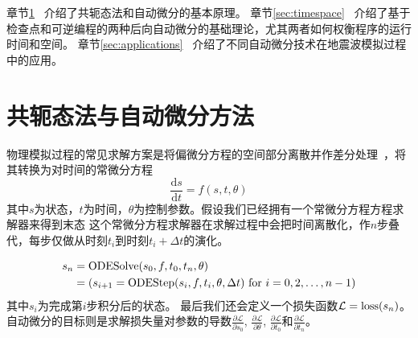 \documentclass[A4,twoside,fontset=ubuntu,UTF8]{ctexart}
\def\D{\mathrm{d}}
\begin{document}

章节\ref{sec:forwardbackward}~ 介绍了共轭态法和自动微分的基本原理。
章节\ref{sec:timespace}~ 介绍了基于检查点和可逆编程的两种后向自动微分的基础理论，尤其两者如何权衡程序的运行时间和空间。
章节\ref{sec:applications}~ 介绍了不同自动微分技术在地震波模拟过程中的应用。

\section{共轭态法与自动微分方法}\label{sec:forwardbackward}

    物理模拟过程的常见求解方案是将偏微分方程的空间部分离散并作差分处理~\cite{Grote2010}，将其转换为对时间的常微分方程
    $$\frac{\D s}{\D t} = f(s, t, \theta)$$
其中$s$为状态，$t$为时间，$\theta$为控制参数。假设我们已经拥有一个常微分方程方程求解器来得到末态
这个常微分方程求解器在求解过程中会把时间离散化，作$n$步叠代，每步仅做从时刻$t_i$到时刻$t_{i}+\Delta t$的演化。

\begin{align}
    \begin{split}
    s_n &= \text{ODESolve}(s_0, f, t_0, t_n, \theta)\\
        &= (s_{i+1} = {\rm ODEStep}(s_{i}, f, t_i, \theta, \Delta t) ~\text{for $i=0,2, \ldots, n-1$})
    \end{split}
\end{align}
其中$s_i$为完成第$i$步积分后的状态。
最后我们还会定义一个损失函数$\mathcal{L} = {\rm loss}(s_n)$。
    自动微分的目标则是求解损失量对参数的导数$\frac{\partial \mathcal{L}}{\partial s_0}$, $\frac{\partial \mathcal{L}}{\partial \theta}$, $\frac{\partial \mathcal{L}}{\partial t_0}$和$\frac{\partial \mathcal{L}}{\partial t_n}$。
\end{document}
